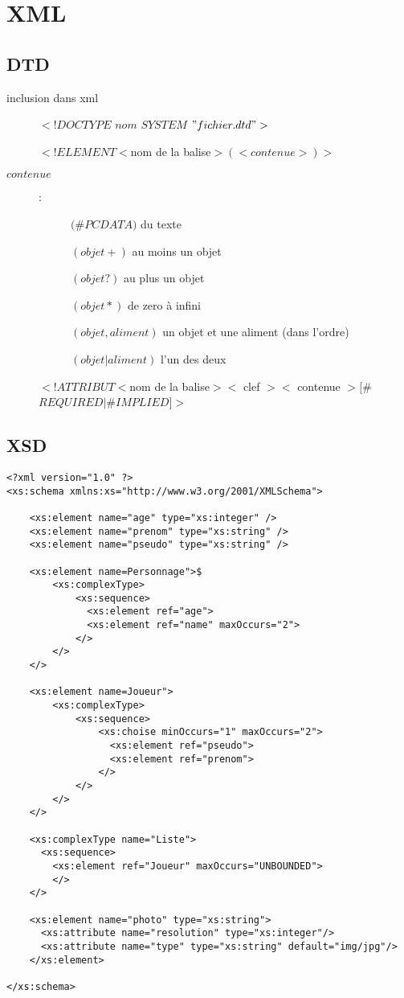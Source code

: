 \part{XML}
\pagebreak

\chapter{DTD}

\begin{description}
\item[inclusion dans xml] $<!DOCTYPE$ $nom$ $SYSTEM$ $"fichier.dtd">$
\item[] $<!ELEMENT <$nom de la balise$> (<contenue>)>$
\item[$contenue$]:
\begin{description}
\item[] $($\#$PCDATA)$ du texte
\item[] $(objet+)$ au moins un objet 
\item[] $(objet?)$ au plus un objet
\item[] $(objet*)$ de zero à infini
\item[] $(objet,aliment)$ un objet et une aliment (dans l'ordre)
\item[] $(objet|aliment)$ l'un des deux
\end{description}

\item[] $<!ATTRIBUT <$nom de la balise$> <$ clef $> <$ contenue $> [$\#$REQUIRED | $\#$IMPLIED] >$
\end{description}

\pagebreak
\chapter{XSD}
\lstset{language=XML}
\begin{lstlisting}
<?xml version="1.0" ?>
<xs:schema xmlns:xs="http://www.w3.org/2001/XMLSchema">

	<xs:element name="age" type="xs:integer" />
	<xs:element name="prenom" type="xs:string" />
	<xs:element name="pseudo" type="xs:string" />
		
	<xs:element name=Personnage">$
		<xs:complexType>
			<xs:sequence>
			  <xs:element ref="age">
			  <xs:element ref="name" maxOccurs="2">
			</>
		</>
	</>
	
	<xs:element name=Joueur">
		<xs:complexType>
			<xs:sequence>
				<xs:choise minOccurs="1" maxOccurs="2">
				  <xs:element ref="pseudo">
				  <xs:element ref="prenom">
				</>
			</>
		</>
	</>
	
	<xs:complexType name="Liste">
	  <xs:sequence>
	    <xs:element ref="Joueur" maxOccurs="UNBOUNDED">
		</>
	</>

	<xs:element name="photo" type="xs:string">
	  <xs:attribute name="resolution" type="xs:integer"/>
	  <xs:attribute name="type" type="xs:string" default="img/jpg"/>
	</xs:element>

</xs:schema>
\end{lstlisting}
\pagebreak

